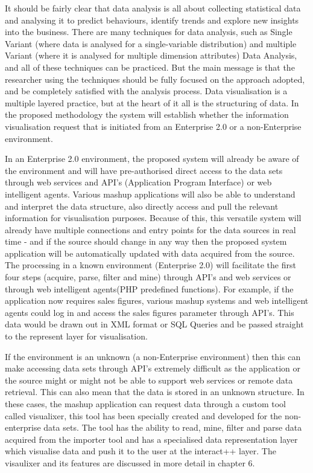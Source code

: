 It should be fairly clear that data analysis is all about collecting statistical data and analysing it to predict behaviours, identify trends and explore new insights into the business. There are many techniques for data analysis, such as Single Variant (where data is analysed for a single-variable distribution) and multiple Variant (where it is analysed for multiple dimension attributes) Data Analysis, and all of these techniques can be practiced. But the main message is that the researcher using the techniques should be fully focused on the approach adopted, and be completely satisfied with the analysis process. Data visualisation is a multiple layered practice, but at the heart of it all is the structuring of data. In the proposed methodology the system will establish whether the information visualisation request that is initiated from an Enterprise 2.0 or a non-Enterprise environment. 

In an Enterprise 2.0 environment, the proposed system will already be aware of the environment and will have pre-authorised direct access to the data sets through web services and API's (Application Program Interface) or web intelligent agents. Various mashup applications will also be able to understand and interpret the data structure, also directly access and pull the relevant information for visualisation purposes. Because of this, this versatile system will already have multiple connections and entry points for the data sources in real time - and if the source should change in any way then the proposed system application will be automatically updated with data acquired from the source. The processing in a known environment (Enterprise 2.0) will facilitate the first four steps (acquire, parse, filter and mine) through API's and web services or through web intelligent agents(PHP predefined functions). For example, if the application now requires sales figures, various mashup systems and web intelligent agents could log in and access the sales figures parameter through API's. This data would be drawn out in XML format or SQL Queries and be passed straight to the represent layer for visualisation.

If the environment is an unknown (a non-Enterprise environment) then this can make accessing data sets through API's extremely difficult as the application or the source might or might not be able to support web services or remote data retrieval. This can also mean that the data is stored in an unknown structure. In these cases, the mashup application can request data through a custom tool called visualixer, this tool has been specially created and developed for the non-enterprise data sets. The tool has the ability to read, mine, filter and parse data acquired from the importer tool and has a specialised data representation layer which visualise data and push it to the user at the interact++ layer. The visaulixer and its features are discussed in more detail in chapter 6.

